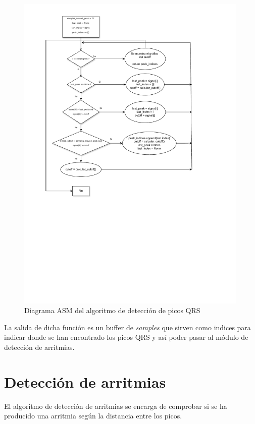 \begin{figure}[h!]
	\centering
    \includegraphics[width=0.99\textwidth]{./Images/img_algoritmo/Diagramapicos.pdf}
    \caption{Diagrama ASM del algoritmo de detección de picos QRS}
    \label{fig:diagramapicos}
\end{figure} 

\FloatBarrier
La salida de dicha función es un buffer de \textit{samples} que sirven como indices para indicar donde se han encontrado
los picos QRS y así poder pasar al módulo de detección de arritmias.

\section{Detección de arritmias}

El algoritmo de detección de arritmias se encarga de comprobar si se ha producido una arritmia según la
distancia entre los picos.

